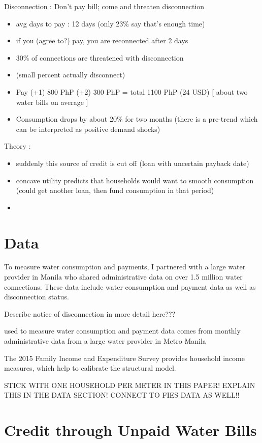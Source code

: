 \documentclass[12pt]{article}
\begin{document}
Disconnection : Don't pay bill; come and threaten disconnection
\begin{itemize}
\item avg days to pay : 12 days (only 23\% say that's enough time)
\item if you (agree to?) pay, you are reconnected after 2 days
\item 30\% of connections are threatened with disconnection
\item (small percent actually disconnect)
\item Pay (+1) 800 PhP (+2) 300 PhP = total 1100 PhP (24 USD) [ about two water bills on average ]
\item Consumption drops by about 20\% for two months (there is a pre-trend which can be interpreted as positive demand shocks)
\end{itemize}

\noindent Theory :
\begin{itemize}
\item suddenly this source of credit is cut off (loan with uncertain payback date)
\item concave utility predicts that households would want to smooth consumption (could get another loan, then fund consumption in that period)
\item 
\end{itemize}


\section{Data}

To measure water consumption and payments, I partnered with a large water provider in Manila who shared administrative data on over 1.5 million water connections.  These data include water consumption and payment data as well as disconnection status.  

Describe notice of disconnection in more detail here???

used to measure water consumption and payment data comes from monthly administrative data from a large water provider in Metro Manila

The 2015 Family Income and Expenditure Survey provides household income measures, which help to calibrate the structural model.  

STICK WITH ONE HOUSEHOLD PER METER IN THIS PAPER!  EXPLAIN THIS IN THE DATA SECTION!  CONNECT TO FIES DATA AS WELL!!


\section{Credit through Unpaid Water Bills}
\end{document}
